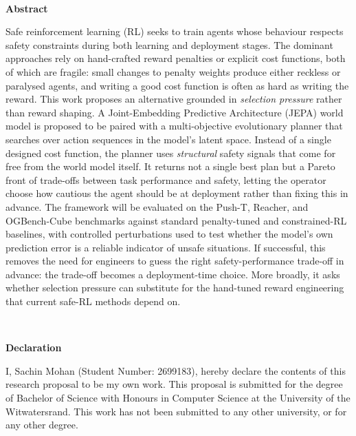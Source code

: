 \documentclass[a4paper,twoside,12pt]{report}
\renewenvironment{abstract}{\ \vfill\begin{center}\textbf{Abstract}\end{center}\addcontentsline{toc}{section}{Abstract}}{\vfill\vfill\newpage}
\newenvironment{declaration}{\ \vfill\begin{center}\textbf{Declaration}\end{center}\addcontentsline{toc}{section}{Declaration}}{\vfill\vfill\newpage}
\begin{document}
\begin{abstract}
Safe reinforcement learning (RL) seeks to train agents whose behaviour respects safety constraints during both learning and deployment stages. The dominant approaches rely on hand-crafted reward penalties or explicit cost functions, both of which are fragile: small changes to penalty weights produce either reckless or paralysed agents, and writing a good cost function is often as hard as writing the reward. This work proposes an alternative grounded in \emph{selection pressure} rather than reward shaping. A Joint-Embedding Predictive Architecture (JEPA) world model is proposed to be paired with a multi-objective evolutionary planner that searches over action sequences in the model's latent space. Instead of a single designed cost function, the planner uses \emph{structural} safety signals that come for free from the world model itself. It returns not a single best plan but a Pareto front of trade-offs between task performance and safety, letting the operator choose how cautious the agent should be at deployment rather than fixing this in advance. The framework will be evaluated on the Push-T, Reacher, and OGBench-Cube benchmarks against standard penalty-tuned and constrained-RL baselines, with controlled perturbations used to test whether the model's own prediction error is a reliable indicator of unsafe situations. If successful, this removes the need for engineers to guess the right safety-performance trade-off in advance: the trade-off becomes a deployment-time choice. More broadly, it asks whether selection pressure can substitute for the hand-tuned reward engineering that current safe-RL methods depend on.
\end{abstract}

\begin{declaration}
I, Sachin Mohan (Student Number: 2699183), hereby declare the contents of this research proposal to be my own work.
This proposal is submitted for the degree of Bachelor of Science with Honours in Computer Science at the University of the Witwatersrand.
This work has not been submitted to any other university, or for any other degree.
\end{declaration}

{}
\tableofcontents
\newpage
{}
{}
\listoffigures
\vspace{1.5cm}
{}
\begingroup
  \let\clearpage\relax
  \let\cleardoublepage\relax
  \listoftables
\endgroup
\newpage
{}
\end{document}
